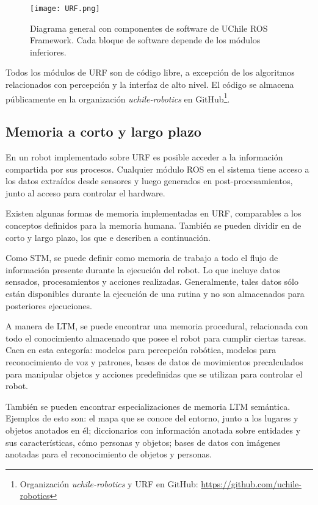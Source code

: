 \begin{figure}[!ht]
	\centering
	\texttt{[image: URF.png]}
	\caption[Componentes de UChile ROS Framework.]
	{\small Diagrama general con componentes de software de UChile ROS Framework. Cada bloque de software depende de los módulos inferiores.}
	\label{img:URF}
\end{figure}

Todos los módulos de URF son de código libre, a excepción de los algoritmos relacionados con percepción y la interfaz de alto nivel. El código se almacena públicamente en la organización \textit{uchile-robotics} en GitHub\footnote{Organización \textit{uchile-robotics} y URF en GitHub: \url{https://github.com/uchile-robotics}}.


\subsection{Memoria a corto y largo plazo}

En un robot implementado sobre URF es posible acceder a la información compartida por sus procesos. Cualquier módulo ROS en el sistema tiene acceso a los datos extraídos desde sensores y luego generados en post-procesamientos, junto al acceso para controlar el hardware.

Existen algunas formas de memoria implementadas en URF, comparables a los conceptos definidos para la memoria humana. También se pueden dividir en de corto y largo plazo, los que e describen a continuación.

Como STM, se puede definir como memoria de trabajo a todo el flujo de información presente durante la ejecución del robot. Lo que incluye datos sensados, procesamientos y acciones realizadas. Generalmente, tales datos sólo están disponibles durante la ejecución de una rutina y no son almacenados para posteriores ejecuciones.

A manera de LTM, se puede encontrar una memoria procedural, relacionada con todo el conocimiento almacenado que posee el robot para cumplir ciertas tareas. Caen en esta categoría: modelos para percepción robótica, modelos para reconocimiento de voz y patrones, bases de datos de movimientos precalculados para manipular objetos y acciones predefinidas que se utilizan para controlar el robot.

También se pueden encontrar especializaciones de memoria LTM semántica. Ejemplos de esto son: el mapa que se conoce del entorno, junto a los lugares y objetos anotados en él; diccionarios con información anotada sobre entidades y sus características, cómo personas y objetos; bases de datos con imágenes anotadas para el reconocimiento de objetos y personas. 

